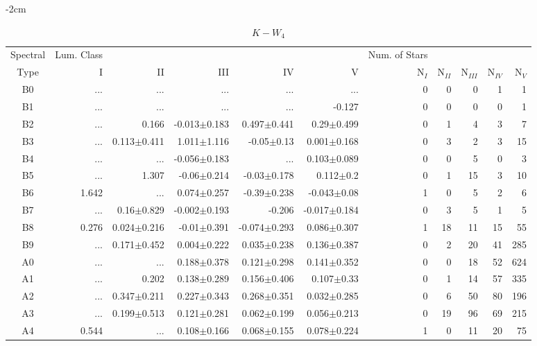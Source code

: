 \begin{table}[t]
    \begin{table}[t]
    \tiny
    \centering
    \caption{$K-W_{4}$}
    \begin{center}
        \addtolength{\leftskip} {-2cm}
        \addtolength{\rightskip}{-2cm}
        \begin{tabular}{c|rrrrr|rrrrr}
        \toprule
        Spectral & Lum. Class & & & & & Num. of Stars & & & &  \\
        Type & I & II & III &  IV & V & N$_{I}$ & N$_{II}$ & N$_{III}$ & N$_{IV}$ & N$_{V}$ \\ \midrule
    B0	&	 ...	&	 ...	&	 ...	&	 ...	&	 ...	&	0	&	0	&	0	&	1	&	1	\\
    B1	&	 ...	&	 ...	&	 ...	&	 ...	&	-0.127	&	0	&	0	&	0	&	0	&	1	\\
    B2	&	 ...	&	0.166	&	-0.013$\pm$0.183	&	0.497$\pm$0.441	&	0.29$\pm$0.499	&	0	&	1	&	4	&	3	&	7	\\
    B3	&	 ...	&	0.113$\pm$0.411	&	1.011$\pm$1.116	&	-0.05$\pm$0.13	&	0.001$\pm$0.168	&	0	&	3	&	2	&	3	&	15	\\
    B4	&	 ...	&	 ...	&	-0.056$\pm$0.183	&	 ...	&	0.103$\pm$0.089	&	0	&	0	&	5	&	0	&	3	\\
    B5	&	 ...	&	1.307	&	-0.06$\pm$0.214	&	-0.03$\pm$0.178	&	0.112$\pm$0.2	&	0	&	1	&	15	&	3	&	10	\\
    B6	&	1.642	&	 ...	&	0.074$\pm$0.257	&	-0.39$\pm$0.238	&	-0.043$\pm$0.08	&	1	&	0	&	5	&	2	&	6	\\
    B7	&	 ...	&	0.16$\pm$0.829	&	-0.002$\pm$0.193	&	-0.206	&	-0.017$\pm$0.184	&	0	&	3	&	5	&	1	&	5	\\
    B8	&	0.276	&	0.024$\pm$0.216	&	-0.01$\pm$0.391	&	-0.074$\pm$0.293	&	0.086$\pm$0.307	&	1	&	18	&	11	&	15	&	55	\\
    B9	&	 ...	&	0.171$\pm$0.452	&	0.004$\pm$0.222	&	0.035$\pm$0.238	&	0.136$\pm$0.387	&	0	&	2	&	20	&	41	&	285	\\
    A0	&	 ...	&	 ...	&	0.188$\pm$0.378	&	0.121$\pm$0.298	&	0.141$\pm$0.352	&	0	&	0	&	18	&	52	&	624	\\
    A1	&	 ...	&	0.202	&	0.138$\pm$0.289	&	0.156$\pm$0.406	&	0.107$\pm$0.33	&	0	&	1	&	14	&	57	&	335	\\
    A2	&	 ...	&	0.347$\pm$0.211	&	0.227$\pm$0.343	&	0.268$\pm$0.351	&	0.032$\pm$0.285	&	0	&	6	&	50	&	80	&	196	\\
    A3	&	 ...	&	0.199$\pm$0.513	&	0.121$\pm$0.281	&	0.062$\pm$0.199	&	0.056$\pm$0.213	&	0	&	19	&	96	&	69	&	215	\\
    A4	&	0.544	&	 ...	&	0.108$\pm$0.166	&	0.068$\pm$0.155	&	0.078$\pm$0.224	&	1	&	0	&	11	&	20	&	75	\\

\end{tabular}
\end{center}
\end{table}
\end{table}

